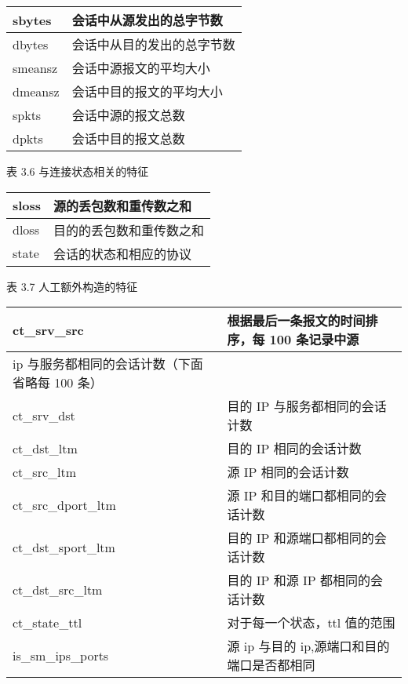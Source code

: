     \begin{table}[]
        \begin{tabular}{|l|l|}
        \hline
        sbytes  & 会话中从源发出的总字节数  \\ \hline
        dbytes  & 会话中从目的发出的总字节数 \\ \hline
        smeansz & 会话中源报文的平均大小   \\ \hline
        dmeansz & 会话中目的报文的平均大小  \\ \hline
        spkts   & 会话中源的报文总数     \\ \hline
        dpkts   & 会话中目的报文总数     \\ \hline
        \end{tabular}
        \end{table}
表 3.6  与连接状态相关的特征 
\begin{table}[]
    \begin{tabular}{|l|l|}
    \hline
    sloss & 源的丢包数和重传数之和  \\ \hline
    dloss & 目的的丢包数和重传数之和 \\ \hline
    state & 会话的状态和相应的协议  \\ \hline
    \end{tabular}
    \end{table}
表 3.7  人工额外构造的特征 
\begin{table}[]
    \begin{tabular}{|l|l|}
    \hline
    ct\_srv\_src                & 根据最后一条报文的时间排序，每 100 条记录中源 \\ \hline
    ip 与服务都相同的会话计数（下面省略每 100 条） &                           \\ \hline
    ct\_srv\_dst                & 目的 IP 与服务都相同的会话计数         \\ \hline
    ct\_dst\_ltm                & 目的 IP 相同的会话计数             \\ \hline
    ct\_src\_ltm                & 源 IP 相同的会话计数              \\ \hline
    ct\_src\_dport\_ltm         & 源 IP 和目的端口都相同的会话计数        \\ \hline
    ct\_dst\_sport\_ltm         & 目的 IP 和源端口都相同的会话计数        \\ \hline
    ct\_dst\_src\_ltm           & 目的 IP 和源 IP 都相同的会话计数      \\ \hline
    ct\_state\_ttl              & 对于每一个状态，ttl 值的范围          \\ \hline
    is\_sm\_ips\_ports          & 源 ip 与目的 ip,源端口和目的端口是否都相同 \\ \hline
    \end{tabular}
    \end{table}
 
